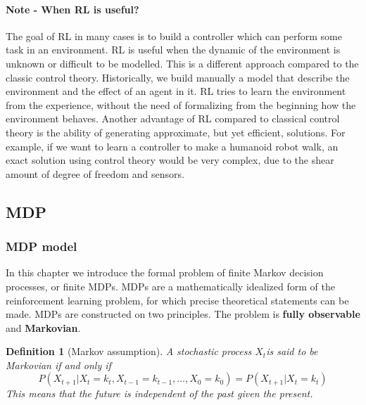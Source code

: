 \documentclass[main.tex]{subfiles}
\newtheorem{definition}{Definition}[section]
\begin{document}
\paragraph{Note - When RL is useful?} The goal of RL in many cases is to build a controller which can perform some task in an environment. RL is useful when the dynamic of the environment is unknown or difficult to be modelled. This is a different approach compared to the classic control theory. Historically, we build manually a model that describe the environment and the effect of an agent in it. RL tries to learn the environment from the experience, without the need of formalizing from the beginning how the environment behaves. Another advantage of RL compared to classical control theory is the ability of generating approximate, but yet efficient, solutions. For example, if we want to learn a controller to make a humanoid robot walk, an exact solution using control theory would be very complex, due to the shear amount of degree of freedom and sensors. 

\subsection{MDP}
\subsubsection{MDP model}
In this chapter we introduce the formal problem of finite Markov decision processes, or finite MDPs. MDPs are a mathematically idealized form of the reinforcement learning problem, for which precise theoretical statements can be made. MDPs are constructed on two principles. The problem is \textbf{fully observable} and \textbf{Markovian}.
\begin{definition}[Markov assumption]
A stochastic process $X_t$\footnotemark is said to be Markovian if and only if 
\begin{equation*}
    P(X_{t+1}|X_t=k_t,X_{t-1}=k_{t-1}, \dots, X_0=k_0) = P(X_{t+1}|X_{t}=k_t)
\end{equation*}
This means that the future is independent of the past given the present.
\end{definition}
\end{document}
